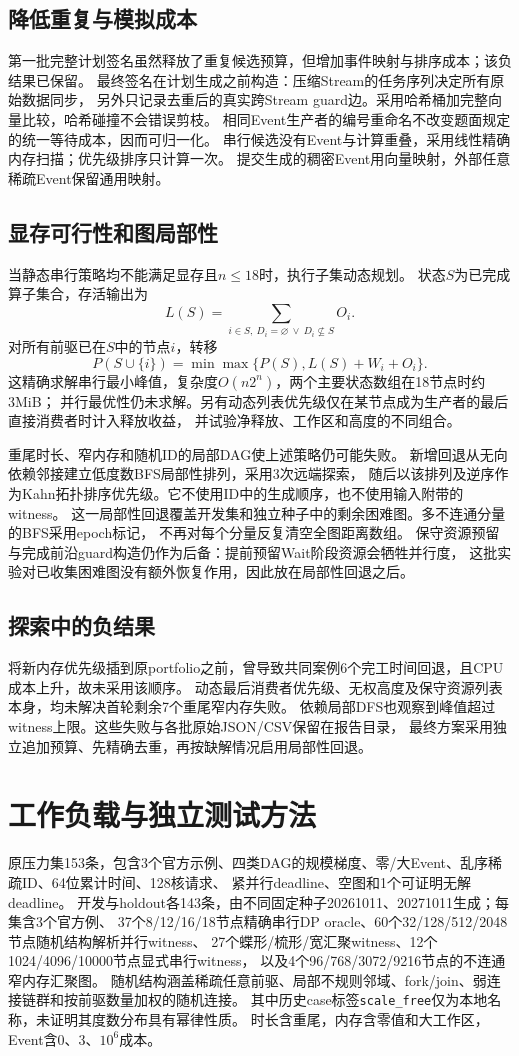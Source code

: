 \documentclass[UTF8,a4paper,11pt,fontset=fandol]{ctexart}
\begin{document}
\subsection{降低重复与模拟成本}
第一批完整计划签名虽然释放了重复候选预算，但增加事件映射与排序成本；该负结果已保留。
最终签名在计划生成之前构造：压缩Stream的任务序列决定所有原始数据同步，
另外只记录去重后的真实跨Stream guard边。采用哈希桶加完整向量比较，哈希碰撞不会错误剪枝。
相同Event生产者的编号重命名不改变题面规定的统一等待成本，因而可归一化。
串行候选没有Event与计算重叠，采用线性精确内存扫描；优先级排序只计算一次。
提交生成的稠密Event用向量映射，外部任意稀疏Event保留通用映射。

\subsection{显存可行性和图局部性}
当静态串行策略均不能满足显存且$n\leq18$时，执行子集动态规划。
状态$S$为已完成算子集合，存活输出为
\[
 L(S)=\sum_{i\in S,\ D_i=\varnothing\ \lor\ D_i\not\subseteq S}O_i.
\]
对所有前驱已在$S$中的节点$i$，转移
\[
 P(S\cup\{i\})=\min\max\{P(S),L(S)+W_i+O_i\}.
\]
这精确求解串行最小峰值，复杂度$O(n2^n)$，两个主要状态数组在18节点时约3MiB；
并行最优性仍未求解。另有动态列表优先级仅在某节点成为生产者的最后直接消费者时计入释放收益，
并试验净释放、工作区和高度的不同组合。

重尾时长、窄内存和随机ID的局部DAG使上述策略仍可能失败。
新增回退从无向依赖邻接建立低度数BFS局部性排列，采用3次远端探索，
随后以该排列及逆序作为Kahn拓扑排序优先级。它不使用ID中的生成顺序，也不使用输入附带的witness。
这一局部性回退覆盖开发集和独立种子中的剩余困难图。多不连通分量的BFS采用epoch标记，
不再对每个分量反复清空全图距离数组。
保守资源预留与完成前沿guard构造仍作为后备：提前预留Wait阶段资源会牺牲并行度，
这批实验对已收集困难图没有额外恢复作用，因此放在局部性回退之后。

\subsection{探索中的负结果}
将新内存优先级插到原portfolio之前，曾导致共同案例6个完工时间回退，且CPU成本上升，故未采用该顺序。
动态最后消费者优先级、无权高度及保守资源列表本身，均未解决首轮剩余7个重尾窄内存失败。
依赖局部DFS也观察到峰值超过witness上限。这些失败与各批原始JSON/CSV保留在报告目录，
最终方案采用独立追加预算、先精确去重，再按缺解情况启用局部性回退。

\section{工作负载与独立测试方法}
原压力集153条，包含3个官方示例、四类DAG的规模梯度、零/大Event、乱序稀疏ID、64位累计时间、128核请求、
紧并行deadline、空图和1个可证明无解deadline。
开发与holdout各143条，由不同固定种子20261011、20271011生成；每集含3个官方例、
37个8/12/16/18节点精确串行DP oracle、60个32/128/512/2048节点随机结构解析并行witness、
27个蝶形/梳形/宽汇聚witness、12个1024/4096/10000节点显式串行witness，
以及4个96/768/3072/9216节点的不连通窄内存汇聚图。
随机结构涵盖稀疏任意前驱、局部不规则邻域、fork/join、弱连接链群和按前驱数量加权的随机连接。
其中历史case标签\texttt{scale\_free}仅为本地名称，未证明其度数分布具有幂律性质。
时长含重尾，内存含零值和大工作区，Event含0、3、$10^6$成本。
\end{document}
